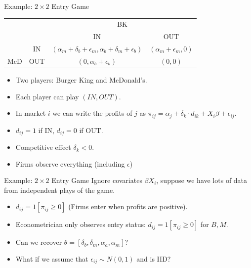 \documentclass[xcolor=pdftex,dvipsnames,table,mathserif]{beamer}
\begin{document}
\begin{frame}[fragile]{Example: $2 \times 2$ Entry Game}
\begin{center}
\begin{tabular}{cc|c|c|}
  & \multicolumn{1}{c}{} & \multicolumn{2}{c}{BK} \\
  & \multicolumn{1}{c}{} & \multicolumn{1}{c}{IN}  & \multicolumn{1}{c}{OUT}   \\\cline{3-4}
            & IN & $(\alpha_m + \delta_b + \epsilon_m, \alpha_b + \delta_m + \epsilon_b)$ & $(\alpha_m  + \epsilon_m, 0)$ \\ \cline{3-4}
McD  & OUT  & $(0, \alpha_b + \epsilon_b)$  & $(0,0)$  \\  \cline{3-4}
\end{tabular}
\end{center}
\begin{itemize}
\item Two players: Burger King and McDonald's.
\item Each player can play $(IN,OUT)$.
\item In market $i$ we can write the profits of $j$ as $\pi_{ij} = \alpha_{j} + \delta_{k} \cdot d_{ik} + X_i \beta+ \epsilon_{ij}$.
\item $d_{ij}=1$ if IN, $d_{ij}=0$ if OUT.
\item Competitive effect $\delta_k < 0$.
\item Firms observe everything (including $\epsilon$)
\end{itemize}
\end{frame}


\begin{frame}[fragile]{Example: $2 \times 2$ Entry Game}
Ignore covariates $\beta X_i$, suppose we have lots of data from independent plays of the game.
\begin{itemize}
\item $d_{ij} =1[\pi_{ij} \geq 0]$ (Firms enter when profits are positive).
\item Econometrician only observes entry status: $d_{ij} =1[\pi_{ij} \geq 0]$ for ${B,M}$.
\item Can we recover $\theta=[\delta_b,\delta_m,\alpha_a,\alpha_m]$? 
\item What if we assume that $\epsilon_{ij} \sim N(0,1)$ and is IID?
\end{itemize}
\end{frame}
\end{document}
